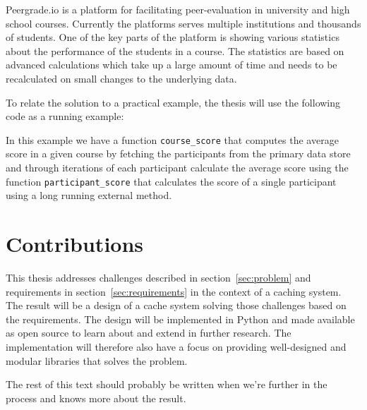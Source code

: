 Peergrade.io is a platform for facilitating peer-evaluation in university and high school courses. Currently the platforms serves multiple institutions and thousands of students. One of the key parts of the platform is showing various statistics about the performance of the students in a course. The statistics are based on advanced calculations which take up a large amount of time and needs to be recalculated on small changes to the underlying data.

To relate the solution to a practical example, the thesis will use the following code as a running example:



In this example we have a function \verb$course_score$ that computes the average score in a given course by fetching the participants from the primary data store and through iterations of each participant calculate the average score using the function \verb$participant_score$ that calculates the score of a single participant using a long running external method.


\section{Contributions}
\label{sec:contributions}

This thesis addresses challenges described in section~\ref{sec:problem} and requirements in section~\ref{sec:requirements} in the context of a caching system. The result will be a design of a cache system solving those challenges based on the requirements. The design will be implemented in Python and made available as open source to learn about and extend in further research. The implementation will therefore also have a focus on providing well-designed and modular libraries that solves the problem.

The rest of this text should probably be written when we’re further in the process and knows more about the result.


